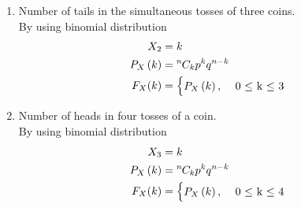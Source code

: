 \documentclass{article}
\providecommand{\brak}[1]{\ensuremath{\left(#1\right)}}
\newcommand*{\permcomb}[4][0mu]{{{}^{#3}\mkern#1#2_{#4}}}
\newcommand*{\comb}[1][-1mu]{\permcomb[#1]{C}}
\begin{document}
\begin{enumerate}[label=13.\arabic{enumi}.\arabic{enumii}]
\begin{enumerate}
\item Number of tails in the simultaneous tosses of three coins.\\
 By using binomial distribution\\
 \begin{align}
X_2 &= k\\ 
 P_X\brak{k} &= \comb{n}{k}p^{k}q^{n-k}\\
  F_X(k) &=
    \begin{cases}
      P_X\brak{k}, & \text{ 0 $\leq$ k $\leq$ 3}\\
    \end{cases}       
\end{align}
\item Number of heads in four tosses of a coin.\\
 By using binomial distribution\\
 \begin{align}
X_3 &= k\\ 
 P_X\brak{k} &= \comb{n}{k}p^{k}q^{n-k}\\
  F_X(k) &=
    \begin{cases}
      P_X\brak{k}, & \text{ 0 $\leq$ k $\leq$ 4}\\
    \end{cases}       
\end{align}
\end{enumerate}
\end{enumerate}
\end{document}
